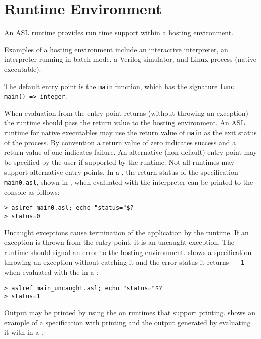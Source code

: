 \chapter{Runtime Environment\label{chap:RuntimeEnvironment}}

An ASL runtime provides run time support within a hosting environment.

Examples of a hosting environment include an interactive interpreter,
an interpreter running in batch mode,
a Verilog simulator, and Linux process (native executable).

The default entry point is the \texttt{main} function, which has the signature
\verb|func main() => integer|.

When evaluation from the entry point returns (without throwing an exception)
the runtime should pass the return value to the hosting environment.
%
An ASL runtime for native executables may use the return value
of \texttt{main} as the exit status of the process.
%
By convention a return value of zero indicates success and a return value of
one indicates failure.
%
An alternative (non-default) entry point may be specified by the user if
supported by the runtime. Not all runtimes may support alternative entry points.
%
In a \linuxbashshell{}, the return status of the specification \texttt{main0.asl},
shown in ,
when evaluated with the \aslref{}
interpreter can be printed to the console as follows:
\begin{verbatim}
> aslref main0.asl; echo "status="$?
> status=0
\end{verbatim}


Uncaught exceptions cause termination of the application by the runtime.
If an exception is thrown from the entry point, it is an uncaught exception.
The runtime should signal an error to the hosting environment.
%
 shows a specification throwing an exception
without catching it and the error status it returns --- \texttt{1} ---
when evaluated with the \aslref{} in a \linuxbashshell{}:
\begin{verbatim}
> aslref main_uncaught.asl; echo "status="$?
> status=1
\end{verbatim}


Output may be printed by using the \printstatementterm{} on
runtimes that support printing.
%
 shows an example of a specification
with printing and the output generated by evaluating it with \aslref{}
in a \linuxbashshell{}.
